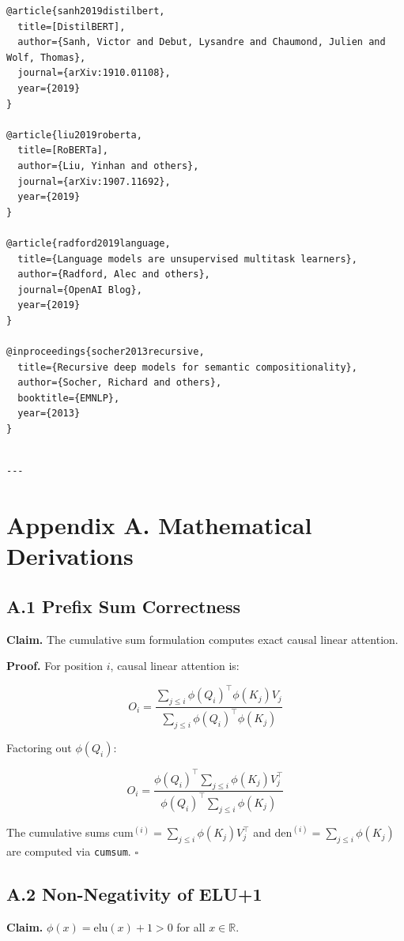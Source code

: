 \begin{lstlisting}
@article{sanh2019distilbert,
  title=[DistilBERT],
  author={Sanh, Victor and Debut, Lysandre and Chaumond, Julien and Wolf, Thomas},
  journal={arXiv:1910.01108},
  year={2019}
}

@article{liu2019roberta,
  title=[RoBERTa],
  author={Liu, Yinhan and others},
  journal={arXiv:1907.11692},
  year={2019}
}

@article{radford2019language,
  title={Language models are unsupervised multitask learners},
  author={Radford, Alec and others},
  journal={OpenAI Blog},
  year={2019}
}

@inproceedings{socher2013recursive,
  title={Recursive deep models for semantic compositionality},
  author={Socher, Richard and others},
  booktitle={EMNLP},
  year={2013}
}
\end{lstlisting}
\begin{lstlisting}

---
\end{lstlisting}


\section{Appendix A. Mathematical Derivations}

\subsection{A.1 Prefix Sum Correctness}

\textbf{Claim.} The cumulative sum formulation computes exact causal linear 
attention.

\textbf{Proof.} For position $i$, causal linear attention is:

\[
O_i = \frac{\sum_{j \le i} \phi(Q_i)^\top \phi(K_j) V_j}{\sum_{j \le i} \phi(Q_i)^\top \phi(K_j)}
\]

Factoring out $\phi(Q_i)$:

\[
O_i = \frac{\phi(Q_i)^\top \sum_{j \le i} \phi(K_j) V_j^\top}{\phi(Q_i)^\top \sum_{j \le i} \phi(K_j)}
\]

The cumulative sums $\text{cum}^{(i)} = \sum_{j \le i} \phi(K_j) V_j^\top$ 
and $\text{den}^{(i)} = \sum_{j \le i} \phi(K_j)$ are computed via \texttt{cumsum}. 
$\square$

\subsection{A.2 Non-Negativity of ELU+1}

\textbf{Claim.} $\phi(x) = \mathrm{elu}(x) + 1 > 0$ for all $x \in \mathbb{R}$.

